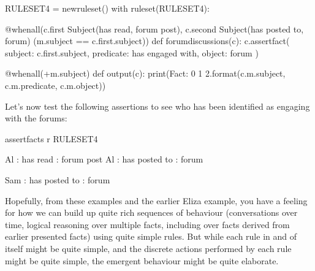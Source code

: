 \documentclass[letterpaper,10pt,english]{sphinxmanual}
\begin{document}
{
\begin{sphinxVerbatim}[commandchars=\\\{\}]
\llap{\color{nbsphinxin}[ ]:\,\hspace{\fboxrule}\hspace{\fboxsep}}RULESET\PYGZus{}4 = new\PYGZus{}ruleset()
with ruleset(RULESET\PYGZus{}4):

    @when\PYGZus{}all(c.first \PYGZlt{}\PYGZlt{} Subject(\PYGZsq{}has read\PYGZsq{}, \PYGZsq{}forum post\PYGZsq{}),
              c.second \PYGZlt{}\PYGZlt{} Subject(\PYGZsq{}has posted to\PYGZsq{}, \PYGZsq{}forum\PYGZsq{}) \PYGZam{} (m.subject == c.first.subject))
    def forum\PYGZus{}discussions(c):
        c.assert\PYGZus{}fact(\PYGZob{} \PYGZsq{}subject\PYGZsq{}: c.first.subject,
                       \PYGZsq{}predicate\PYGZsq{}: \PYGZsq{}has engaged with\PYGZsq{},
                       \PYGZsq{}object\PYGZsq{}: \PYGZsq{}forum\PYGZsq{} \PYGZcb{})

    @when\PYGZus{}all(+m.subject)
    def output(c):
        print(\PYGZsq{}Fact: \PYGZob{}0\PYGZcb{} \PYGZob{}1\PYGZcb{} \PYGZob{}2\PYGZcb{}\PYGZsq{}.format(c.m.subject, c.m.predicate, c.m.object))
\end{sphinxVerbatim}
}

Let’s now test the following assertions to see who has been identified as engaging with the forums:

{
\begin{sphinxVerbatim}[commandchars=\\\{\}]
\llap{\color{nbsphinxin}[ ]:\,\hspace{\fboxrule}\hspace{\fboxsep}}\PYGZpc{}\PYGZpc{}assert\PYGZus{}facts \PYGZhy{}r RULESET\PYGZus{}4

Al : has read : forum post
Al : has posted to : forum

Sam : has posted to : forum
\end{sphinxVerbatim}
}

Hopefully, from these examples and the earlier Eliza example, you have a feeling for how we can build up quite rich sequences of behaviour (conversations over time, logical reasoning over multiple facts, including over facts derived from earlier presented facts) using quite simple rules. But while each rule in and of itself might be quite simple, and the discrete actions performed by each rule might be quite simple, the emergent behaviour might be quite elaborate.
\end{document}
